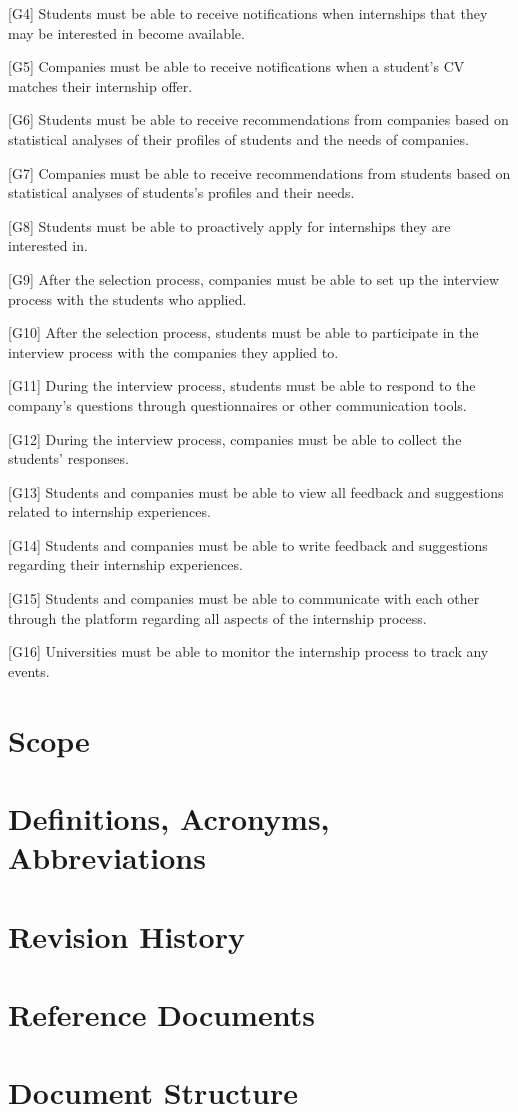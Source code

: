 [G4] Students must be able to receive notifications when internships that they may be interested in become available.

[G5] Companies must be able to receive notifications when a student's CV matches their internship offer.

[G6] Students must be able to receive recommendations from companies based on statistical analyses of their profiles of students and the needs of companies.

[G7] Companies must be able to receive recommendations from students based on statistical analyses of students's profiles and their needs.

[G8] Students must be able to proactively apply for internships they are interested in.

[G9] After the selection process, companies must be able to set up the interview process with the students who applied.

[G10] After the selection process, students must be able to participate in the interview process with the companies they applied to.

[G11] During the interview process, students must be able to respond to the company's questions through questionnaires or other communication tools.

[G12] During the interview process, companies must be able to collect the students' responses.

[G13] Students and companies must be able to view all feedback and suggestions related to internship experiences.

[G14] Students and companies must be able to write feedback and suggestions regarding their internship experiences.

[G15] Students and companies must be able to communicate with each other through the platform regarding all aspects of the internship process.

[G16] Universities must be able to monitor the internship process to track any events.

\section{Scope}
\label{sec:Scope}

\section{Definitions, Acronyms, Abbreviations}
\label{sec:definitions}

\section{Revision History}
\label{sec:revision}

\section{Reference Documents}
\label{sec:reference}

\section{Document Structure}
\label{sec:structure}
